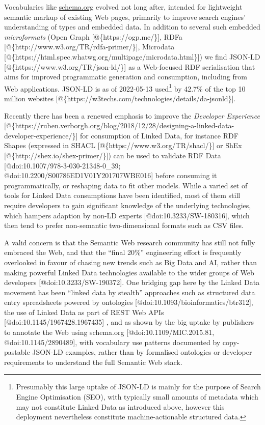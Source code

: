Vocabularies like \href{https://schema.org/}{schema.org} evolved not
long after, intended for lightweight semantic markup of existing Web
pages, primarily to improve search engines' understanding of types and
embedded data. In addition to several such embedded \emph{microformats}
(Open Graph {[}@\{https://ogp.me/\}{]}, RDFa
{[}@\{http://www.w3.org/TR/rdfa-primer/\}{]}, Microdata
{[}@\{https://html.spec.whatwg.org/multipage/microdata.html\}{]}) we
find JSON-LD {[}@\{https://www.w3.org/TR/json-ld/\}{]} as a Web-focused
RDF serialisation that aims for improved programmatic generation and
consumption, including from Web applications. JSON-LD is as of
2022-05-13 used\footnote{Presumably this large uptake of JSON-LD is
  mainly for the purpose of Search Engine Optimisation (SEO), with
  typically small amounts of metadata which may not constitute Linked
  Data as introduced above, however this deployment nevertheless
  constitute machine-actionable structured data.} by 42.7\% of the top
10 million websites
{[}@\{https://w3techs.com/technologies/details/da-jsonld\}{]}.

Recently there has been a renewed emphasis to improve the
\emph{Developer Experience}
{[}@\{https://ruben.verborgh.org/blog/2018/12/28/designing-a-linked-data-developer-experience/\}{]}
for consumption of Linked Data, for instance RDF Shapes (expressed in
SHACL {[}@\{https://www.w3.org/TR/shacl/\}{]} or ShEx
{[}@\{http://shex.io/shex-primer/\}{]}) can be used to validate RDF Data
{[}@doi:10.1007/978-3-030-21348-0\_39;
@doi:10.2200/S00786ED1V01Y201707WBE016{]} before consuming it
programmatically, or reshaping data to fit other models. While a varied
set of tools for Linked Data consumptions have been identified, most of
them still require developers to gain significant knowledge of the
underlying technologies, which hampers adaption by non-LD experts
{[}@doi:10.3233/SW-180316{]}, which then tend to prefer non-semantic
two-dimensional formats such as CSV files.

A valid concern is that the Semantic Web research community has still
not fully embraced the Web, and that the ``final 20\%'' engineering
effort is frequently overlooked in favour of chasing new trends such as
Big Data and AI, rather than making powerful Linked Data technologies
available to the wider groups of Web developers
{[}@doi:10.3233/SW-190372{]}. One bridging gap here by the Linked Data
movement has been ``linked data by stealth'' approaches such as
structured data entry spreadsheets powered by ontologies
{[}@doi:10.1093/bioinformatics/btr312{]}, the use of Linked Data as part
of REST Web APIs {[}@doi:10.1145/1967428.1967435{]} , and as shown by
the big uptake by publishers to annotate the Web using schema.org
{[}@doi:10.1109/MIC.2015.81, @doi:10.1145/2890489{]}, with vocabulary
use patterns documented by copy-pastable JSON-LD examples, rather than
by formalised ontologies or developer requirements to understand the
full Semantic Web stack.

